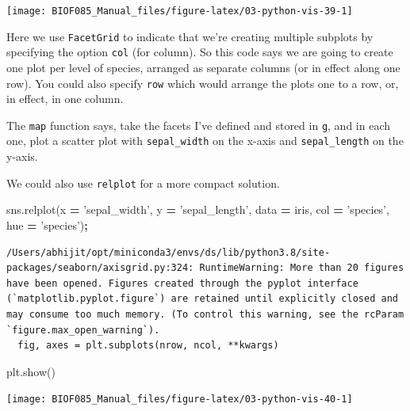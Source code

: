 \documentclass[
  letterpaper,
]{scrbook}
\newenvironment{Shaded}{\begin{snugshade}}{\end{snugshade}}
\newcommand{\NormalTok}[1]{#1}
\newcommand{\OperatorTok}[1]{\textcolor[rgb]{0.81,0.36,0.00}{\textbf{#1}}}
\newcommand{\StringTok}[1]{\textcolor[rgb]{0.31,0.60,0.02}{#1}}
\begin{document}
\begin{center}\texttt{[image: BIOF085\_Manual\_files/figure-latex/03-python-vis-39-1]} \end{center}

Here we use \texttt{FacetGrid} to indicate that we're creating multiple subplots by specifying the option \texttt{col} (for column). So this code says we are going to create one plot per level of species, arranged as separate columns (or in effect along one row). You could also specify \texttt{row} which would arrange the plots one to a row, or, in effect, in one column.

The \texttt{map} function says, take the facets I've defined and stored in \texttt{g}, and in each one, plot a scatter plot with \texttt{sepal\_width} on the x-axis and \texttt{sepal\_length} on the y-axis.

We could also use \texttt{relplot} for a more compact solution.

\begin{Shaded}
\begin{Highlighting}[]
\NormalTok{sns.relplot(x }\OperatorTok{=} \StringTok{'sepal_width'}\NormalTok{, y }\OperatorTok{=} \StringTok{'sepal_length'}\NormalTok{, data }\OperatorTok{=}\NormalTok{ iris, }
\NormalTok{            col }\OperatorTok{=} \StringTok{'species'}\NormalTok{, hue }\OperatorTok{=} \StringTok{'species'}\NormalTok{)}\OperatorTok{;}
\end{Highlighting}
\end{Shaded}

\begin{verbatim}
/Users/abhijit/opt/miniconda3/envs/ds/lib/python3.8/site-packages/seaborn/axisgrid.py:324: RuntimeWarning: More than 20 figures have been opened. Figures created through the pyplot interface (`matplotlib.pyplot.figure`) are retained until explicitly closed and may consume too much memory. (To control this warning, see the rcParam `figure.max_open_warning`).
  fig, axes = plt.subplots(nrow, ncol, **kwargs)
\end{verbatim}

\begin{Shaded}
\begin{Highlighting}[]
\NormalTok{plt.show()}
\end{Highlighting}
\end{Shaded}

\begin{center}\texttt{[image: BIOF085\_Manual\_files/figure-latex/03-python-vis-40-1]} \end{center}
\end{document}
